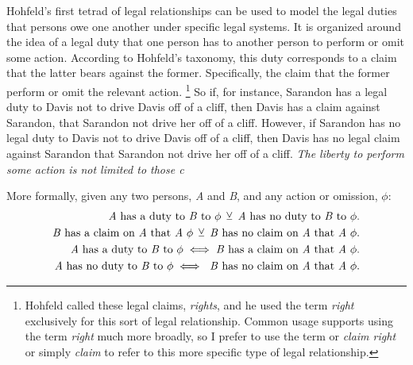 Hohfeld's first tetrad of legal relationships can be used to model the legal
duties that persons owe one another under specific legal systems.
It is organized around the idea of a legal duty that one person has to another
person to perform or omit some action.
According to Hohfeld's taxonomy, this duty corresponds to a claim that the
latter bears against the former.
Specifically, the claim that the former perform or omit the relevant action.
\footnote{Hohfeld called these legal claims, \emph{rights}, and he used the
	term \emph{right} exclusively for this sort of legal relationship.
	Common usage supports using the term \emph{right} much more broadly, so I
	prefer to use the term or \emph{claim right} or simply \emph{claim} to refer to
	this more specific type of legal relationship.\label{fn:rightclaim}} So if, for
instance, Sarandon has a legal duty to Davis not to drive Davis off of a cliff,
then Davis has a claim against Sarandon, that Sarandon not drive her off of a
cliff.
However, if Sarandon has no legal duty to Davis not to drive Davis off of a
cliff,\footnotemark{} then Davis has no legal claim against Sarandon that
Sarandon not drive her off of a cliff.
\emph{The liberty to perform some action is not limited to those c}


More formally, given any two persons, \emph{A} and \emph{B}, and any action or omission, $\phi$:
\begin{align}
	\text{\emph{A} has a duty to \emph{B} to }\phi\: \veebar\: \text{\emph{A} has no duty to \emph{B} to }\phi.                             \\
	\text{\emph{B} has a claim on \emph{A} that \emph{A} }\phi{}\: \veebar\: \text{\emph{B} has no claim on \emph{A} that \emph{A} }\phi{}. \\
	\text{\emph{A} has a duty to \emph{B} to }\phi \iff \text{\emph{B} has a claim on \emph{A} that \emph{A} }\phi.                         \\
	\text{\emph{A} has no duty to \emph{B} to }\phi \iff \text{ \emph{B} has no claim on \emph{A} that \emph{A} }\phi.
\end{align}

